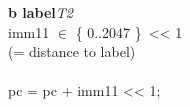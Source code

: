 


\begin{instructionblock}{\imagewidth}%
    \textbf{b label}\hfill\textit{T2}\\
    imm11 $\in$ \{ 0..2047 \}\ {<}{<} 1\\
    (= distance to label)\\
    {}\\
    pc = pc + imm11 {<}{<} 1;
\end{instructionblock}

